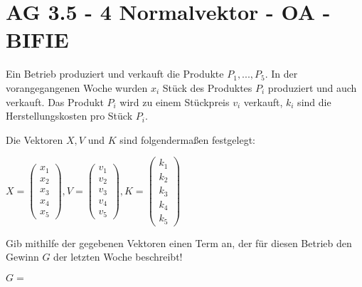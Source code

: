 \section{AG 3.5 - 4 Normalvektor - OA - BIFIE}

\begin{beispiel}[AG 3.5]{1} %
Ein Betrieb produziert und verkauft die Produkte $P_{1}, ..., P_{5}$. In der vorangegangenen Woche wurden $x_{i}$ Stück des Produktes $P_{i}$ produziert und auch verkauft. Das Produkt $P_{i}$ wird zu einem Stückpreis $v_{i}$ verkauft, $k_{i}$ sind die Herstellungskosten pro Stück $P_{i}$.

Die Vektoren $X,V$ und $K$ sind folgendermaßen festgelegt:
\leer

\begin{center}
$X=\left(\begin{array}{r}x_1\\x_2\\x_3\\x_4\\x_5\end{array}\right), V=\left(\begin{array}{r}v_1\\v_2\\v_3\\v_4\\v_5\end{array}\right), K=\left(\begin{array}{r}k_1\\k_2\\k_3\\k_4\\k_5\end{array}\right)$
\end{center}

Gib mithilfe der gegebenen Vektoren einen Term an, der für diesen Betrieb den Gewinn $G$ der letzten Woche beschreibt!
\leer

$G=$ 
\end{beispiel}
